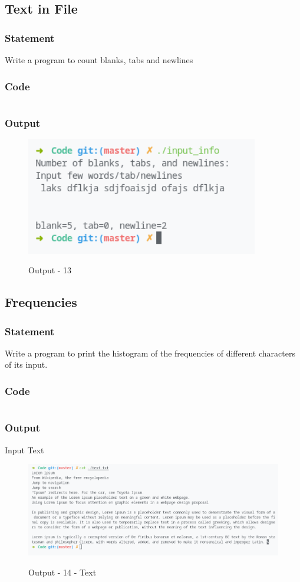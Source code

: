 \pagebreak
\subsection{Text in File}
\subsubsection{Statement}
Write a program to count blanks, tabs and newlines
\subsubsection{Code}
\inputminted[]{c}{../Code/input_info.cpp}
\subsubsection{Output}
\begin{figure}[!htb]
  \centering
  \includegraphics[width=4in]{Images/input_info.png}
  \label{Output-13}
  \caption{Output - 13}
\end{figure}


\pagebreak
\subsection{Frequencies}
\subsubsection{Statement}
Write a program to print the histogram of the frequencies of different characters of its input.
\subsubsection{Code}
\inputminted[]{c}{../Code/histogram.cpp}
\pagebreak
\subsubsection{Output}
Input Text
\begin{figure}[!htb]
  \centering
  \includegraphics[width=6in]{Images/text.png}
  \label{Output-14-Text}
  \caption{Output - 14 - Text}
\end{figure}


